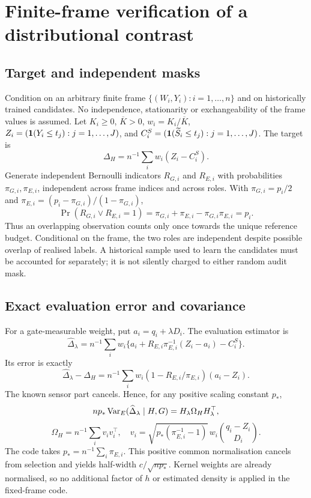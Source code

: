 \section{Finite-frame verification of a distributional contrast}
\subsection{Target and independent masks}
Condition on an arbitrary finite frame $\{(W_i,Y_i):i=1,\ldots,n\}$ and on historically trained candidates. No independence, stationarity or exchangeability of the frame values is assumed. Let $K_i\geq0$, $\overline K>0$, $w_i=K_i/\overline K$, $Z_i=(\mathbf 1(Y_i\leq t_j):j=1,\ldots,J)$, and $C_i^S=(\mathbf 1(\widetilde S_i\leq t_j):j=1,\ldots,J)$. The target is
\[
 \Delta_H=n^{-1}\sum_iw_i(Z_i-C_i^S).
\]
Generate independent Bernoulli indicators $R_{G,i}$ and $R_{E,i}$ with probabilities $\pi_{G,i},\pi_{E,i}$, independent across frame indices and across roles. With $\pi_{G,i}=p_i/2$ and $\pi_{E,i}=(p_i-\pi_{G,i})/(1-\pi_{G,i})$,
\[
 \Pr(R_{G,i}\lor R_{E,i}=1)=\pi_{G,i}+\pi_{E,i}-\pi_{G,i}\pi_{E,i}=p_i.
\]
Thus an overlapping observation counts only once towards the unique reference budget. Conditional on the frame, the two roles are independent despite possible overlap of realised labels. A historical sample used to learn the candidates must be accounted for separately; it is not silently charged to either random audit mask.

\subsection{Exact evaluation error and covariance}
For a gate-measurable weight, put $a_i=q_i+\lambda D_i$. The evaluation estimator is
\[
 \widehat\Delta_\lambda=n^{-1}\sum_iw_i
 \{a_i+R_{E,i}\pi_{E,i}^{-1}(Z_i-a_i)-C_i^S\}.
\]
Its error is exactly
\begin{equation}\label{eq:designerror}
 \widehat\Delta_\lambda-\Delta_H
 =n^{-1}\sum_iw_i(1-R_{E,i}/\pi_{E,i})(a_i-Z_i).
\end{equation}
The known sensor part cancels. Hence, for any positive scaling constant $p_*$,
\[
 np_*\operatorname{Var}_E(\widehat\Delta_\lambda\mid H,G)
 =H_\lambda\Omega_HH_\lambda^\top,
\]
\begin{equation}\label{eq:designomega}
 \Omega_H=n^{-1}\sum_i v_iv_i^\top,\quad
 v_i=\sqrt{p_*(\pi_{E,i}^{-1}-1)}\,w_i\binom{q_i-Z_i}{D_i}.
\end{equation}
The code takes $p_*=n^{-1}\sum_i\pi_{E,i}$. This positive common normalisation cancels from selection and yields half-width $c/\sqrt{np_*}$. Kernel weights are already normalised, so no additional factor of $h$ or estimated density is applied in the fixed-frame code.

